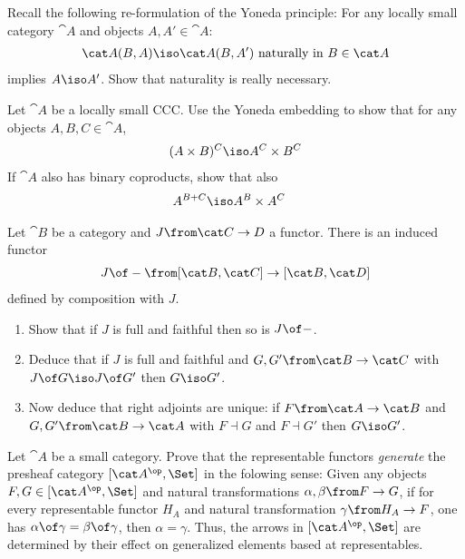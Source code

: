 \begin{exercise}
  Recall the following re-formulation of the Yoneda principle: For any locally small category $\cat A$ and objects $A,A'\in\cat A$:
  \begin{align*}
    \cat A(B,A)\iso \cat  A(B,A')\text{ naturally in } B\in\cat A
  \end{align*}
implies $A\iso A'$. Show that naturality is really necessary.
\end{exercise}

\begin{exercise}
  Let $\cat A$ be a locally small CCC. Use the Yoneda embedding to show that for any objects $A,B,C\in\cat A$,
  \begin{align*}
    (A\times B)^C\iso A^C\times B^C
  \end{align*}
  If $\cat A$ also has binary coproducts, show that also
  \begin{align*}
    A^{B+C}&\iso A^B\times A^C
  \end{align*}
\end{exercise}

\begin{exercise}
  Let $\cat B$ be a category and $J\from\cat C\to D$ a functor. There is an induced functor
  \begin{align*}
    J\of -\from[\cat B,\cat C]\to [\cat B,\cat D]
  \end{align*}
  defined by composition with $J$.
  \begin{enumerate}
  \item Show that if $J$ is full and faithful then so is $J\of -$.
  \item Deduce that if $J$ is full and faithful and $G,G'\from\cat B\to\cat C$ with $J\of G\iso J\of G'$ then $G\iso G'$.
  \item Now deduce that right adjoints are unique: if $F\from \cat A\to\cat B$ and $G,G'\from\cat B\to \cat A$ with $F\dashv G$ and $F\dashv G'$ then $G\iso G'$. 
  \end{enumerate}
\end{exercise}

\begin{exercise}
  Let $\cat A$ be a small category. Prove that the representable functors \emph{generate} the presheaf category $[\cat A^\op,\Set]$ in the folowing sense: Given any objects $F,G\in[\cat A^\op,\Set]$ and natural transformations $\alpha,\beta\from F\to G$, if for every representable functor $H_A$ and natural transformation $\gamma\from H_A\to F$, one has $\alpha\of\gamma=\beta\of\gamma$, then $\alpha=\gamma$. Thus, the arrows in $[\cat A^\op,\Set]$ are determined by their effect on generalized elements based at representables.
\end{exercise}

